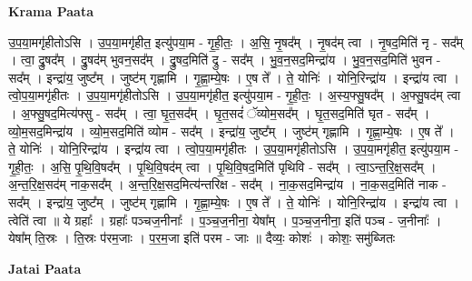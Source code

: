 \documentclass[17pt]{extarticle}
\begin{document}
\textbf{Krama Paata} \newline

उ॒प॒या॒मगृ॑हीतोऽसि । उ॒प॒या॒मगृ॑हीत॒ इत्यु॑पया॒म - गृ॒ही॒तः॒ । अ॒सि॒ नृ॒षद᳚म् । नृ॒षद॑म् त्वा । नृ॒षद॒मिति॑ नृ - सद᳚म् । त्वा॒ द्रु॒षद᳚म् । द्रु॒षद॑म् भुवन॒सद᳚म् । द्रु॒षद॒मिति॑ द्रु - सद᳚म् । भु॒व॒न॒सद॒मिन्द्रा॑य । भु॒व॒न॒सद॒मिति॑ भुवन - सद᳚म् । इन्द्रा॑य॒ जुष्ट᳚म् । जुष्ट॑म् गृह्णामि । गृ॒ह्णा॒म्ये॒षः । ए॒ष ते᳚ । ते॒ योनिः॑ । योनि॒रिन्द्रा॑य । इन्द्रा॑य त्वा । त्वो॒प॒या॒मगृ॑हीतः । उ॒प॒या॒मगृ॑हीतोऽसि । उ॒प॒या॒मगृ॑हीत॒ इत्यु॑पया॒म - गृ॒ही॒तः॒ । अ॒स्य॒फ्सु॒षद᳚म् । अ॒फ्सु॒षद॑म् त्वा । अ॒फ्सु॒षद॒मित्य॑फ्सु - सद᳚म् । त्वा॒ घृ॒त॒सद᳚म् । घृ॒त॒सदं॑ ॅव्योम॒सद᳚म् । घृ॒त॒सद॒मिति॑ घृत - सद᳚म् । व्यो॒म॒सद॒मिन्द्रा॑य । व्यो॒म॒सद॒मिति॑ व्योम - सद᳚म् । इन्द्रा॑य॒ जुष्ट᳚म् । जुष्ट॑म् गृह्णामि । गृ॒ह्णा॒म्ये॒षः । ए॒ष ते᳚ । ते॒ योनिः॑ । योनि॒रिन्द्रा॑य । इन्द्रा॑य त्वा । त्वो॒प॒या॒मगृ॑हीतः । उ॒प॒या॒मगृ॑हीतोऽसि । उ॒प॒या॒मगृ॑हीत॒ इत्यु॑पया॒म - गृ॒ही॒तः॒ । अ॒सि॒ पृ॒थि॒वि॒षद᳚म् । पृ॒थि॒वि॒षद॑म् त्वा । पृ॒थि॒वि॒षद॒मिति॑ पृथिवि - सद᳚म् । त्वा॒ऽन्त॒रि॒क्ष॒सद᳚म् । अ॒न्त॒रि॒क्ष॒सद॑म् नाक॒सद᳚म् । अ॒न्त॒रि॒क्ष॒सद॒मित्य॑न्तरिक्ष - सद᳚म् । ना॒क॒सद॒मिन्द्रा॑य । ना॒क॒सद॒मिति॑ नाक - सद᳚म् । इन्द्रा॑य॒ जुष्ट᳚म् । जुष्ट॑म् गृह्णामि । गृ॒ह्णा॒म्ये॒षः । ए॒ष ते᳚ । ते॒ योनिः॑ । योनि॒रिन्द्रा॑य । इन्द्रा॑य त्वा । त्वेति॑ त्वा ॥ ये ग्रहाः᳚ । ग्रहाः᳚ पञ्चज॒नीनाः᳚ । प॒ञ्च॒ज॒नीना॒ येषा᳚म् । प॒ञ्च॒ज॒नीना॒ इति॑ पञ्च - ज॒नीनाः᳚ । येषा᳚म् ति॒स्रः । ति॒स्रः प॑रम॒जाः । प॒र॒म॒जा इति॑ परम - जाः ॥ दैव्यः॒ कोशः॑ । कोशः॒ समु॑ब्जितः \newline

\textbf{Jatai Paata} \newline
\end{document}

